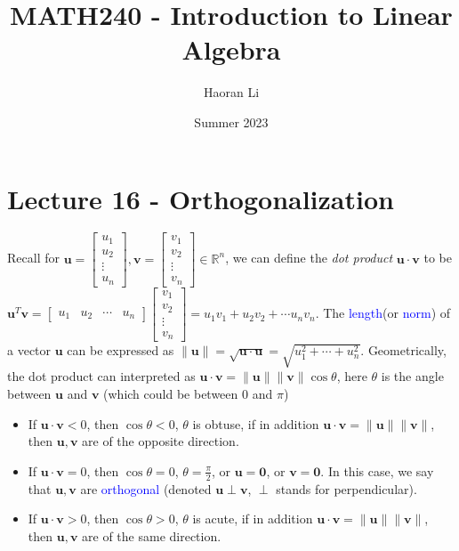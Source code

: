 \documentclass{beamer}
\title{MATH240 - Introduction to Linear Algebra}
\author{Haoran Li}
\institute[UMD]{University of Maryland, College Park}
\date{Summer 2023}
\theoremstyle{definition}
\theoremstyle{remark}
\begin{document}
\maketitle

\section{Lecture 16 - Orthogonalization}

\begin{frame}[t]
Recall for $\mathbf u=\begin{bmatrix}
u_1\\u_2\\\vdots\\u_n
\end{bmatrix},\mathbf v=\begin{bmatrix}
v_1\\v_2\\\vdots\\v_n
\end{bmatrix}\in\mathbb R^n$, we can define the \textit{dot product} $\mathbf u\cdot\mathbf v$ to be $\mathbf u^T\mathbf v=\begin{bmatrix}
u_1&u_2&\cdots&u_n
\end{bmatrix}\begin{bmatrix}
v_1\\v_2\\\vdots\\v_n
\end{bmatrix}=u_1v_1+u_2v_2+\cdots u_nv_n$\pause. The \textcolor{blue}{length}(or \textcolor{blue}{norm}) of a vector $\mathbf u$ can be expressed as $\|\mathbf u\|=\sqrt{\mathbf u\cdot\mathbf u}=\sqrt{u_1^2+\cdots+u_n^2}$\pause. Geometrically, the dot product can interpreted as $\mathbf u\cdot\mathbf v=\|\mathbf u\|\|\mathbf v\|\cos\theta$, here $\theta$ is the angle between $\mathbf u$ and $\mathbf v$ (which could be between 0 and $\pi$)\pause
\begin{itemize}
\item If $\mathbf u\cdot\mathbf v<0$, then $\cos\theta<0$, $\theta$ is obtuse, if in addition $\mathbf u\cdot\mathbf v=\|\mathbf u\|\|\mathbf v\|$, then $\mathbf u,\mathbf v$ are of the opposite direction.\pause
\item If $\mathbf u\cdot\mathbf v=0$, then $\cos\theta=0$, $\theta=\frac{\pi}{2}$, or $\mathbf u=\mathbf0$, or $\mathbf v=\mathbf0$. In this case, we say that $\mathbf u,\mathbf v$ are \textcolor{blue}{orthogonal} (denoted $\mathbf u\perp\mathbf v$, $\perp$ stands for perpendicular).\pause
\item If $\mathbf u\cdot\mathbf v>0$, then $\cos\theta>0$, $\theta$ is acute, if in addition $\mathbf u\cdot\mathbf v=\|\mathbf u\|\|\mathbf v\|$, then $\mathbf u,\mathbf v$ are of the same direction.
\end{itemize}
\end{frame}
\end{document}
